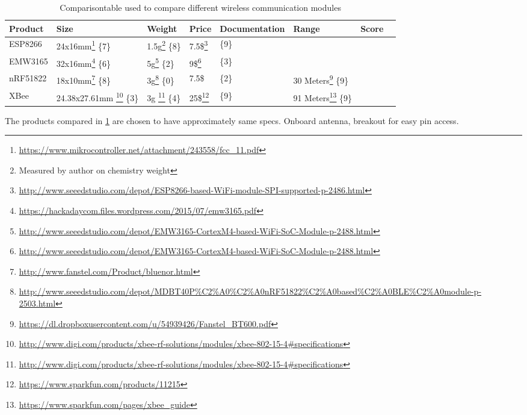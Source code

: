 \begin{table}[H]
	\centering
	\begin{tabular}{@{}|l|l|l|l|l|l|l|l|@{}}
		\toprule
		\textbf{Product} & \textbf{Size} & \textbf{Weight} & \textbf{Price} & \textbf{Documentation} &  \textbf{Range}  & \textbf{Score} \\ \midrule
		ESP8266   &  24x16mm\footnote{\url{https://www.mikrocontroller.net/attachment/243558/fcc\_11.pdf}} \hfill\{7\} & 1.5g\footnote{Measured by author on chemistry weight} \hfill\{8\} &   7.5\$\footnote{\url{http://www.seeedstudio.com/depot/ESP8266-based-WiFi-module-SPI-supported-p-2486.html}}    &   \hfill\{9\}        &        &                		\\ \midrule
		EMW3165   &  32x16mm\footnote{\url{https://hackadaycom.files.wordpress.com/2015/07/emw3165.pdf}} \hfill\{6\}  & 5g\footnote{\url{http://www.seeedstudio.com/depot/EMW3165-CortexM4-based-WiFi-SoC-Module-p-2488.html}} \hfill\{2\} &  9\$\footnote{\url{http://www.seeedstudio.com/depot/EMW3165-CortexM4-based-WiFi-SoC-Module-p-2488.html}}   &    \hfill\{3\}	        &        &                		\\ \midrule
		nRF51822  &  18x10mm\footnote{\url{http://www.fanstel.com/Product/bluenor.html}} \hfill\{8\}  & 3g\footnote{\url{http://www.seeedstudio.com/depot/MDBT40P\%C2\%A0\%C2\%A0nRF51822\%C2\%A0based\%C2\%A0BLE\%C2\%A0module-p-2503.html}} \hfill\{0\}  &  7.5\$  & \hfill\{2\} 	        &   30 Meters\footnote{\url{https://dl.dropboxusercontent.com/u/54939426/Fanstel_BT600.pdf}} \hfill\{9\}     &                		\\ \midrule
		XBee      &  24.38x27.61mm \footnote{\url{http://www.digi.com/products/xbee-rf-solutions/modules/xbee-802-15-4\#specifications}} \{3\} & 3g \footnote{\url{http://www.digi.com/products/xbee-rf-solutions/modules/xbee-802-15-4\#specifications}} \hfill\{4\} &   25\$\footnote{\url{https://www.sparkfun.com/products/11215}}    &     \hfill\{9\}      &            91 Meters\footnote{\url{https://www.sparkfun.com/pages/xbee_guide}}  \hfill\{9\}  &                    \\ \bottomrule
	\end{tabular}
	\caption{Comparisontable used to compare different wireless 		communication modules}
	\label{tab:compare_table_wireless_communication}
\end{table}
The products compared in \ref{tab:compare_table_wireless_communication} are chosen to have approximately same specs. Onboard antenna, breakout for easy pin access.

